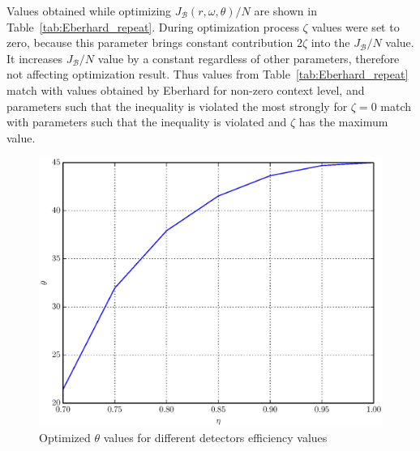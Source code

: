 \documentclass[%
master,         %
subf,           %
href,           %
colorlinks=true %
]{disser}
\numberwithin{equation}{section}
\numberwithin{figure}{section}
\begin{document}
Values obtained while optimizing $J_{\mathcal{B}}(r, \omega, \theta) / N$ are shown in  
Table~\ref{tab:Eberhard_repeat}. During optimization process  $\zeta$ values were set to zero, 
because this parameter brings constant contribution $2\zeta$ into the $J_{\mathcal{B}} / N$ value. It increases $J_{\mathcal{B}} / N$ value by a constant regardless of other parameters, 
therefore not affecting optimization result. Thus values from Table~\ref{tab:Eberhard_repeat} 
match with values obtained by Eberhard \citep{Eberhard} for non-zero context level, and parameters such that the inequality is
violated the most strongly for $\zeta = 0$ match with parameters such that the inequality is
violated and $\zeta$ has the maximum value.

\begin{figure}[h]
\includegraphics[scale=0.7]{theta.eps}
\caption{Optimized $\theta$ values for different detectors efficiency values}
\label{fig:theta_opt}
\end{figure}
\end{document}
